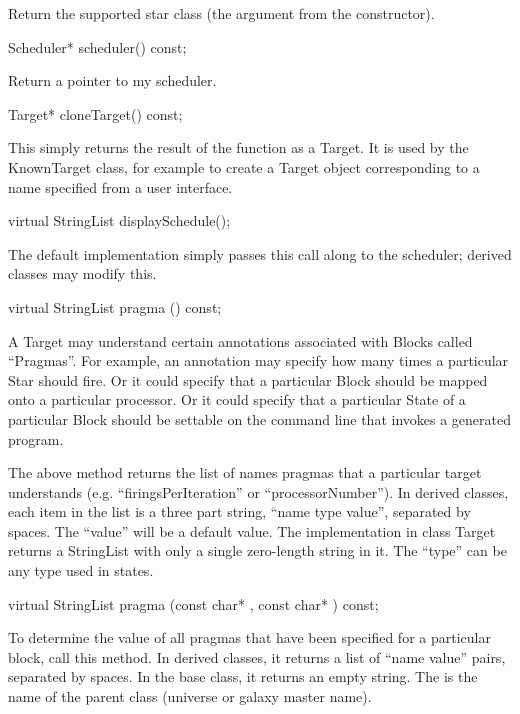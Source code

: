 Return the supported star class (the  argument from
the constructor).

\begin{example}
Scheduler* scheduler() const;
\end{example}

Return a pointer to my scheduler.

\begin{example}
Target* cloneTarget() const;
\end{example}

This simply returns the result of the  function as a Target.
It is used by the KnownTarget class, for example to create a Target
object corresponding to a name specified from a user interface.

\begin{example}
virtual StringList displaySchedule();
\end{example}

The default implementation simply passes this call along to the
scheduler; derived classes may modify this.

\begin{example}
virtual StringList pragma () const;
\end{example}

A Target may understand certain annotations associated with Blocks
called ``Pragmas''.  For example, an annotation may specify how
many times a particular Star should fire.
Or it could specify that a particular Block should be mapped
onto a particular processor.  Or it could specify that a particular
State of a particular Block should be settable on the command line
that invokes a generated program.

The above method returns the list of names
pragmas that a particular target understands (e.g. ``firingsPerIteration'' or
``processorNumber'').
In derived classes, each item in the list is a three
part string, ``name type value'', separated by spaces.
The ``value'' will be a default value.
The implementation in class Target returns a StringList
with only a single zero-length string in it.
The ``type'' can be any type used in states.

\begin{example}
virtual StringList pragma (const char* , const char* ) const;
\end{example}

To determine the value of all pragmas that have been
specified for a particular block, call this method.
In derived classes, it returns a list of ``name value''
pairs, separated by spaces.  In the base class, it
returns an empty string. The  is the name
of the parent class (universe or galaxy master name).

